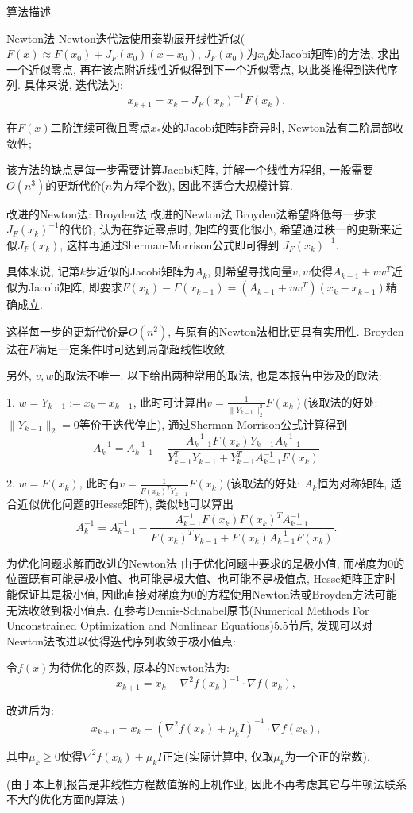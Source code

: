 \documentclass{article}
\begin{document}
\begin{section}{算法描述}
\begin{subsection}{Newton法}
    Newton迭代法使用泰勒展开线性近似($F(x)\approx F(x_0)+J_F(x_0)(x-x_0)$, $J_F(x_0)$为$x_0$处Jacobi矩阵)的方法, 求出一个近似零点, 再在该点附近线性近似得到下一个近似零点, 以此类推得到迭代序列. 
    具体来说, 迭代法为:
    $$x_{k+1} = x_k - J_F(x_k)^{-1}F(x_k).$$

    在$F(x)$二阶连续可微且零点$x_\ast$处的Jacobi矩阵非奇异时, Newton法有二阶局部收敛性; 

    该方法的缺点是每一步需要计算Jacobi矩阵, 并解一个线性方程组, 一般需要$O(n^3)$的更新代价($n$为方程个数), 因此不适合大规模计算.
\end{subsection}
\begin{subsection}{改进的Newton法: Broyden法}
    改进的Newton法:Broyden法希望降低每一步求$J_F(x_k)^{-1}$的代价, 认为在靠近零点时, 矩阵的变化很小, 希望通过秩一的更新来近似$J_F(x_k)$, 这样再通过Sherman-Morrison公式即可得到
    $J_F(x_k)^{-1}$.

    具体来说, 记第$k$步近似的Jacobi矩阵为$A_k$, 则希望寻找向量$v,w$使得$A_{k-1}+vw^T$近似为Jacobi矩阵, 
    即要求$F(x_k)-F(x_{k-1}) = (A_{k-1}+vw^T)(x_k-x_{k-1})$精确成立.

    这样每一步的更新代价是$O(n^2)$, 与原有的Newton法相比更具有实用性. Broyden法在$F$满足一定条件时可达到局部超线性收敛.

    另外, $v,w$的取法不唯一. 以下给出两种常用的取法, 也是本报告中涉及的取法:

    1. $w=Y_{k-1}:=x_k-x_{k-1}$, 此时可计算出$v=\frac{1}{\|Y_{k-1}\|_2^2}F(x_k)$(该取法的好处: $\|Y_{k-1}\|_2=0$等价于迭代停止), 通过Sherman-Morrison公式计算得到
    $$A_k^{-1} = A_{k-1}^{-1}-\frac{A_{k-1}^{-1}F(x_k)Y_{k-1}A_{k-1}^{-1}}{Y_{k-1}^TY_{k-1}+Y_{k-1}^TA_{k-1}^{-1}F(x_k)}$$

    2. $w=F(x_k)$, 此时有$v=\frac{1}{F(x_k)^TY_{k-1}}F(x_k)$(该取法的好处: $A_k$恒为对称矩阵, 适合近似优化问题的Hesse矩阵), 类似地可以算出
    $$A_k^{-1} = A_{k-1}^{-1}-\frac{A_{k-1}^{-1}F(x_k)F(x_k)^TA_{k-1}^{-1}}{F(x_k)^TY_{k-1}+F(x_k)A_{k-1}^{-1}F(x_k)}.$$
\end{subsection}
\begin{subsection}{为优化问题求解而改进的Newton法}
    由于优化问题中要求的是极小值, 而梯度为0的位置既有可能是极小值、也可能是极大值、也可能不是极值点, Hesse矩阵正定时能保证其是极小值, 因此直接对梯度为0的方程使用Newton法或Broyden方法可能无法收敛到极小值点. 
    在参考Dennis-Schnabel原书(Numerical Methods For Unconstrained Optimization and Nonlinear Equations)5.5节后, 发现可以对Newton法改进以使得迭代序列收敛于极小值点:

    令$f(x)$为待优化的函数, 原本的Newton法为:
    $$x_{k+1}=x_k-\nabla^2 f(x_k)^{-1}\cdot \nabla f(x_k),$$

    改进后为:
    $$x_{k+1}=x_k-(\nabla^2 f(x_k)+\mu_kI)^{-1}\cdot \nabla f(x_k),$$

    其中$\mu_k\geq 0$使得$\nabla^2 f(x_k)+\mu_kI$正定(实际计算中, 仅取$\mu_k$为一个正的常数).

    (由于本上机报告是非线性方程数值解的上机作业, 因此不再考虑其它与牛顿法联系不大的优化方面的算法.)
\end{subsection}
\end{section}
\end{document}
